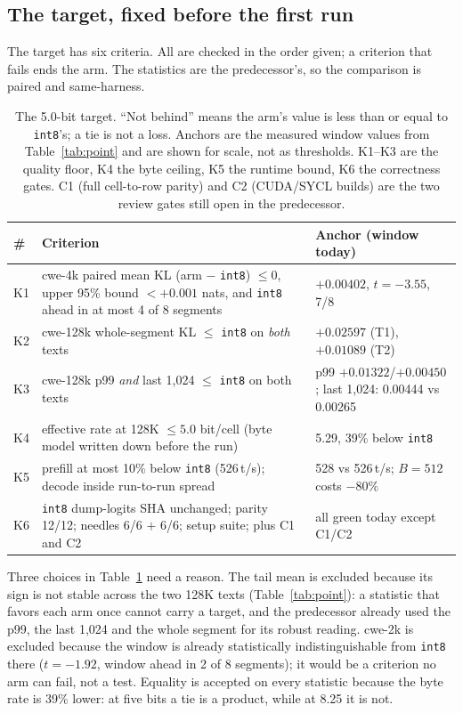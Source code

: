 \documentclass[10pt,twocolumn]{article}
\begin{document}
\subsection{The target, fixed before the first run}

The target has six criteria. All are checked in the order given; a criterion that fails ends the arm. The statistics are the predecessor's, so the comparison is paired and same-harness.

\begin{table}[t]
\centering
\footnotesize
\caption{The 5.0-bit target. ``Not behind'' means the arm's value is less than or equal to \texttt{int8}'s; a tie is not a loss. Anchors are the measured window values from Table~\ref{tab:point} and are shown for scale, not as thresholds. K1--K3 are the quality floor, K4 the byte ceiling, K5 the runtime bound, K6 the correctness gates. C1 (full cell-to-row parity) and C2 (CUDA/SYCL builds) are the two review gates still open in the predecessor.}
\label{tab:target}
\begin{tabularx}{\textwidth}{@{}l>{\raggedright\arraybackslash}Xl@{}}
\toprule
\# & Criterion & Anchor (window today) \\
\midrule
K1 & cwe-4k paired mean KL (arm $-$ \texttt{int8}) $\le 0$, upper 95\% bound $< +0.001$ nats, and \texttt{int8} ahead in at most 4 of 8 segments & $+0.00402$, $t{=}-3.55$, 7/8 \\
K2 & cwe-128k whole-segment KL $\le$ \texttt{int8} on \emph{both} texts & $+0.02597$ (T1), $+0.01089$ (T2) \\
K3 & cwe-128k p99 \emph{and} last 1,024 $\le$ \texttt{int8} on both texts & p99 $+0.01322$/$+0.00450$; last 1,024: 0.00444 vs 0.00265 \\
K4 & effective rate at 128K $\le 5.0$ bit/cell (byte model written down before the run) & 5.29, 39\% below \texttt{int8} \\
K5 & prefill at most 10\% below \texttt{int8} (526\,t/s); decode inside run-to-run spread & 528 vs 526\,t/s; $B{=}512$ costs $-80\%$ \\
K6 & \texttt{int8} dump-logits SHA unchanged; parity 12/12; needles 6/6 $+$ 6/6; setup suite; plus C1 and C2 & all green today except C1/C2 \\
\bottomrule
\end{tabularx}
\end{table}

Three choices in Table~\ref{tab:target} need a reason. The tail mean is excluded because its sign is not stable across the two 128K texts (Table~\ref{tab:point}): a statistic that favors each arm once cannot carry a target, and the predecessor already used the p99, the last 1,024 and the whole segment for its robust reading. cwe-2k is excluded because the window is already statistically indistinguishable from \texttt{int8} there ($t{=}-1.92$, window ahead in 2 of 8 segments); it would be a criterion no arm can fail, not a test. Equality is accepted on every statistic because the byte rate is 39\% lower: at five bits a tie is a product, while at 8.25 it is not.
\end{document}
